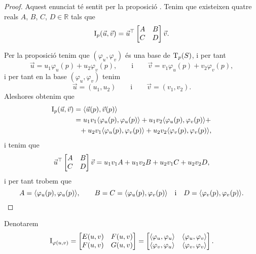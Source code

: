 \documentclass[../Apunts.tex]{subfiles}
\begin{document}
	\begin{proof}
		Aquest enunciat té sentit per la proposició . Tenim que existeixen quatre reals \(A\), \(B\), \(C\), \(D\in\mathbb{R}\) tals que
		\[\I_{p}(\vec{u},\vec{v})=\vec{u}^{\transposta}\begin{bmatrix}
			A & B \\
			C & D
		\end{bmatrix}\vec{v}.\]
		
		Per la proposició  tenim que \((\varphi_{u},\varphi_{v})\) és una base de \(\operatorname{T}_{p}(S)\), i per tant
		\[\vec{u}=u_{1}\varphi_{u}(p)+u_{2}\varphi_{v}(p),\qquad\text{i}\qquad\vec{v}=v_{1}\varphi_{u}(p)+v_{2}\varphi_{v}(p),\]
		i per tant en la base \((\varphi_{u},\varphi_{v})\) tenim
		\[\vec{u}=(u_{1},u_{2})\qquad\text{i}\qquad\vec{v}=(v_{1},v_{2}).\]
		Aleshores obtenim que
		\begin{align*}
			\I_{p}(\vec{u},\vec{v})&=\prodesc{\vec{u}(p)}{\vec{v}(p)} \\
			&=u_{1}v_{1}\prodesc{\varphi_{u}(p)}{\varphi_{u}(p)}+u_{1}v_{2}\prodesc{\varphi_{u}(p)}{\varphi_{v}(p)}+\\
			&\phantom{=}+u_{2}v_{1}\prodesc{\varphi_{u}(p)}{\varphi_{v}(p)}+u_{2}v_{2}\prodesc{\varphi_{v}(p)}{\varphi_{v}(p)},
		\end{align*}
		i tenim que
		\[\vec{u}^{\top}\begin{bmatrix}
			A & B \\
			C & D
		\end{bmatrix}\vec{v}=u_{1}v_{1}A+u_{1}v_{2}B+u_{2}v_{1}C+u_{2}v_{2}D,\]
		i per tant trobem que
		\[A=\prodesc{\varphi_{u}(p)}{\varphi_{u}(p)},\qquad B=C=\prodesc{\varphi_{u}(p)}{\varphi_{v}(p)}\quad\text{i}\quad D=\prodesc{\varphi_{v}(p)}{\varphi_{v}(p)}.\qedhere\]
	\end{proof}
	\begin{notation}
		\label{notation:primera forma fonamental}
		Denotarem
		\[\I_{\varphi(u,v)}=\begin{bmatrix}
			E(u,v) & F(u,v) \\
			F(u,v) & G(u,v)
		\end{bmatrix}=
		\begin{bmatrix}
			\prodesc{\varphi_{u}}{\varphi_{u}} & \prodesc{\varphi_{u}}{\varphi_{v}} \\
			\prodesc{\varphi_{v}}{\varphi_{u}} & \prodesc{\varphi_{v}}{\varphi_{v}}
		\end{bmatrix}.\]
	\end{notation}
\end{document}
